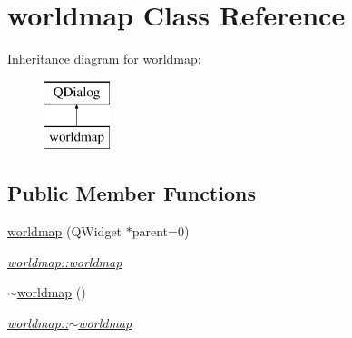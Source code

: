 \hypertarget{classworldmap}{\section{worldmap Class Reference}
\label{classworldmap}
}
Inheritance diagram for worldmap\-:\begin{figure}[H]
\begin{center}
\leavevmode
\includegraphics[height=2.000000cm]{classworldmap}
\end{center}
\end{figure}
\subsection*{Public Member Functions}
\begin{DoxyCompactItemize}
\item 
\hyperlink{classworldmap_a970f51f58c07cc43b110fecf43519838}{worldmap} (Q\-Widget $\ast$parent=0)
\begin{DoxyCompactList}\small\item\em \hyperlink{classworldmap_a970f51f58c07cc43b110fecf43519838}{worldmap\-::worldmap} \end{DoxyCompactList}\item 
\hypertarget{classworldmap_a3ae55f6ff120219ab10a80123cb8b537}{\hyperlink{classworldmap_a3ae55f6ff120219ab10a80123cb8b537}{$\sim$worldmap} ()}\label{classworldmap_a3ae55f6ff120219ab10a80123cb8b537}

\begin{DoxyCompactList}\small\item\em \hyperlink{classworldmap_a3ae55f6ff120219ab10a80123cb8b537}{worldmap\-::$\sim$worldmap} \end{DoxyCompactList}\end{DoxyCompactItemize}
